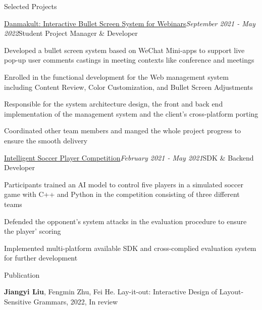 \documentclass{resume} %
\newcommand{\Feb}{February }
\newcommand{\May}{May }
\newcommand{\Sept}{September }
\begin{document}
\begin{rSection}{Selected Projects}
  
\begin{rSubsection}{\href{https://github.com/panda2134/DanmakuIt}{Danmakult: Interactive Bullet Screen System for Webinars}}{\em \Sept 2021 - \May 2022}{Student Project Manager \& Developer}{}
    
\item Developed a bullet screen system based on WeChat Mini-apps to support live pop-up user comments castings in meeting contexts like conference and meetings
\item Enrolled in the functional development for the Web management system including Content Review, Color Customization, and Bullet Screen Adjustments
\item Responsible for the system architecture design, the front and back end implementation of the management system and the client's cross-platform porting
\item Coordinated other team members and manged the whole project progress to ensure the smooth delivery

\end{rSubsection}

\begin{rSubsection}{\href{https://github.com/ssast-tech/thuai-egg-2021-backend}{Intelligent Soccer Player Competition}}{\em \Feb 2021 - \May 2021}{SDK \& Backend Developer}{}
    
\item Participants trained an AI model to control five players in a simulated soccer game with C++ and Python in the competition consisting of three different teams
\item Defended the opponent's system attacks in the evaluation procedure to ensure the player' scoring
\item Implemented multi-platform available SDK and cross-complied evaluation system for further development


\end{rSubsection}

\end{rSection}

\begin{rSection}{Publication}
  

\textbf{Jiangyi Liu}, Fengmin Zhu, Fei He. Lay-it-out: Interactive Design of Layout-Sensitive Grammars, 2022, In review

 
    
\end{rSection}
\end{document}
